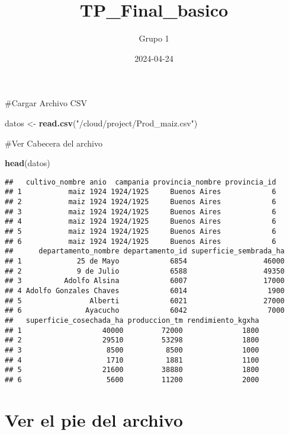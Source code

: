 \documentclass[
]{article}
\title{TP\_Final\_basico}
\author{Grupo 1}
\date{2024-04-24}
\newenvironment{Shaded}{\begin{snugshade}}{\end{snugshade}}
\newcommand{\FunctionTok}[1]{\textcolor[rgb]{0.13,0.29,0.53}{\textbf{#1}}}
\newcommand{\NormalTok}[1]{#1}
\newcommand{\OtherTok}[1]{\textcolor[rgb]{0.56,0.35,0.01}{#1}}
\newcommand{\StringTok}[1]{\textcolor[rgb]{0.31,0.60,0.02}{#1}}
\begin{document}
\maketitle

\#Cargar Archivo CSV

\begin{Shaded}
\begin{Highlighting}[]
\NormalTok{datos }\OtherTok{\textless{}{-}} \FunctionTok{read.csv}\NormalTok{(}\StringTok{"/cloud/project/Prod\_maiz.csv"}\NormalTok{)}
\end{Highlighting}
\end{Shaded}

\#Ver Cabecera del archivo

\begin{Shaded}
\begin{Highlighting}[]
\FunctionTok{head}\NormalTok{(datos)}
\end{Highlighting}
\end{Shaded}

\begin{verbatim}
##   cultivo_nombre anio  campania provincia_nombre provincia_id
## 1           maiz 1924 1924/1925     Buenos Aires            6
## 2           maiz 1924 1924/1925     Buenos Aires            6
## 3           maiz 1924 1924/1925     Buenos Aires            6
## 4           maiz 1924 1924/1925     Buenos Aires            6
## 5           maiz 1924 1924/1925     Buenos Aires            6
## 6           maiz 1924 1924/1925     Buenos Aires            6
##      departamento_nombre departamento_id superficie_sembrada_ha
## 1             25 de Mayo            6854                  46000
## 2             9 de Julio            6588                  49350
## 3          Adolfo Alsina            6007                  17000
## 4 Adolfo Gonzales Chaves            6014                   1900
## 5                Alberti            6021                  27000
## 6               Ayacucho            6042                   7000
##   superficie_cosechada_ha produccion_tm rendimiento_kgxha
## 1                   40000         72000              1800
## 2                   29510         53298              1800
## 3                    8500          8500              1000
## 4                    1710          1881              1100
## 5                   21600         38880              1800
## 6                    5600         11200              2000
\end{verbatim}

\hypertarget{ver-el-pie-del-archivo}{%
\section{Ver el pie del archivo}\label{ver-el-pie-del-archivo}}
\end{document}
